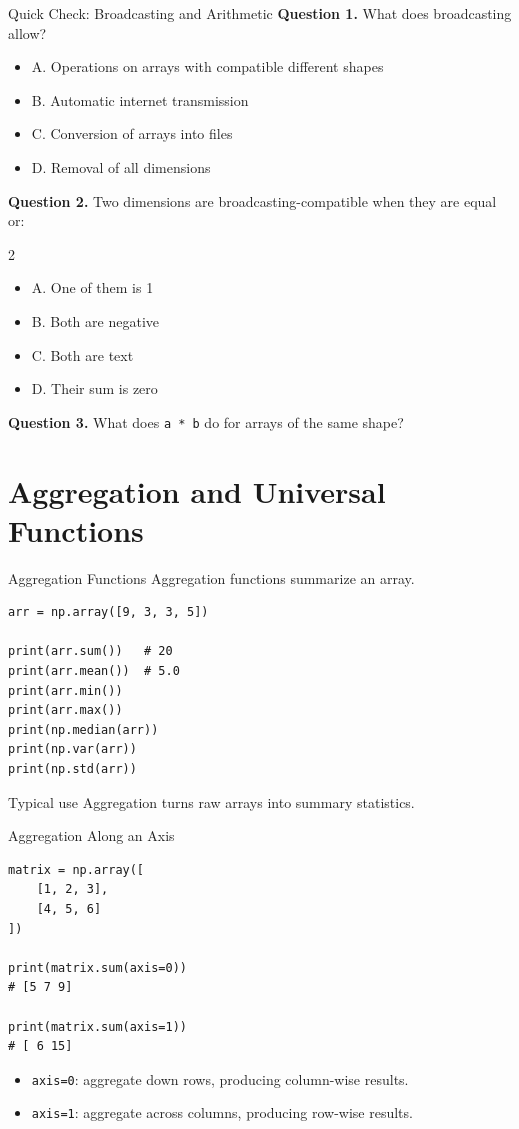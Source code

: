 \documentclass[aspectratio=169,11pt]{beamer}
\newcommand{\quiztitle}[1]{\textbf{\textcolor{QuizOrange}{#1}}}
\begin{document}
\begin{frame}{Quick Check: Broadcasting and Arithmetic}
\small
\quiztitle{Question 1.} What does broadcasting allow?
\begin{itemize}
  \item A. Operations on arrays with compatible different shapes
  \item B. Automatic internet transmission
  \item C. Conversion of arrays into files
  \item D. Removal of all dimensions
\end{itemize}
\quiztitle{Question 2.} Two dimensions are broadcasting-compatible when they are equal or:
\begin{multicols}{2}
\begin{itemize}
  \item A. One of them is 1
  \item B. Both are negative
  \item C. Both are text
  \item D. Their sum is zero
\end{itemize}
\end{multicols}
\quiztitle{Question 3.} What does \texttt{a * b} do for arrays of the same shape?
\end{frame}

\section{Aggregation and Universal Functions}

\begin{frame}[fragile]{Aggregation Functions}
\small
Aggregation functions summarize an array.
\begin{lstlisting}[style=py]
arr = np.array([9, 3, 3, 5])

print(arr.sum())   # 20
print(arr.mean())  # 5.0
print(arr.min())
print(arr.max())
print(np.median(arr))
print(np.var(arr))
print(np.std(arr))
\end{lstlisting}
\begin{block}{Typical use}
Aggregation turns raw arrays into summary statistics.
\end{block}
\end{frame}

\begin{frame}[fragile]{Aggregation Along an Axis}
\small
\begin{lstlisting}[style=py]
matrix = np.array([
    [1, 2, 3],
    [4, 5, 6]
])

print(matrix.sum(axis=0))
# [5 7 9]

print(matrix.sum(axis=1))
# [ 6 15]
\end{lstlisting}
\begin{itemize}
  \item \texttt{axis=0}: aggregate down rows, producing column-wise results.
  \item \texttt{axis=1}: aggregate across columns, producing row-wise results.
\end{itemize}
\end{frame}
\end{document}
